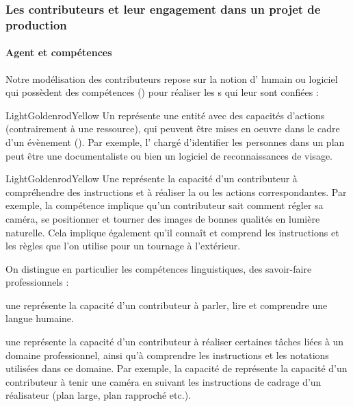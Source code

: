 \subsubsection{Les contributeurs et leur engagement dans un projet de production}
\paragraph{Agent et compétences}
Notre modélisation des contributeurs repose sur la notion d' humain ou logiciel qui possèdent des compétences () pour réaliser les s qui leur sont confiées :
\begin{cadrecol}{LightGoldenrodYellow}
Un  représente une entité avec des capacités d'actions (contrairement à une ressource), qui peuvent être mises en oeuvre dans le cadre d'un évènement ().
Par exemple, l' chargé d'identifier les personnes dans un plan peut être une documentaliste ou bien un logiciel de reconnaissances de visage.
\end{cadrecol}

\begin{cadrecol}{LightGoldenrodYellow}
Une  représente la capacité d'un contributeur à compréhendre des instructions et à réaliser la ou les actions correspondantes.
Par exemple, la compétence  implique qu'un contributeur sait comment régler sa caméra, se positionner et tourner des images de bonnes qualités en lumière naturelle. 
Cela implique également qu'il connaît et comprend les instructions et les règles que l'on utilise pour un tournage à l'extérieur.
\end{cadrecol}

On distingue en particulier les compétences linguistiques, des savoir-faire professionnels : 
\begin{liste}
	\item une  représente la capacité d'un contributeur à parler, lire et comprendre une langue humaine.
	\item une  représente la capacité d'un contributeur à réaliser certaines tâches liées à un domaine professionnel, ainsi qu'à comprendre les instructions et les notations utilisées dans ce domaine. 
	Par exemple, la capacité de  représente la capacité d'un contributeur à tenir une caméra en suivant les instructions de cadrage d'un réalisateur (plan large, plan rapproché etc.).
\end{liste}

